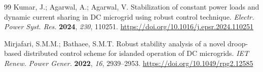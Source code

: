 \begin{thebibliography}{99}
Kumar, J.; Agarwal, A.; Agarwal, V.
Stabilization of constant power loads and dynamic current sharing in DC microgrid using robust control technique.
\emph{Electr. Power Syst. Res.} \textbf{2024}, \emph{230}, 110251.
\url{https://doi.org/10.1016/j.epsr.2024.110251}

Mirjafari, S.M.M.; Bathaee, S.M.T.
Robust stability analysis of a novel droop-based distributed control scheme for islanded operation of DC microgrids.
\emph{IET Renew. Power Gener.} \textbf{2022}, \emph{16}, 2939--2953.
\url{https://doi.org/10.1049/rpg2.12585}

\end{thebibliography}
